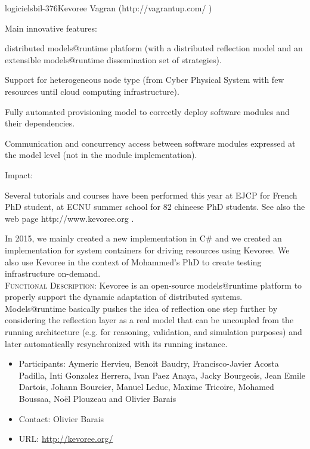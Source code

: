 \documentclass{ra2018}
\begin{document}
\begin{module}{logiciels}{bil-376}{Kevoree}
    Vagran (http://vagrantup.com/ )

Main innovative features:

    distributed models@runtime platform (with a distributed reflection model and an extensible models@runtime dissemination set of strategies).

    Support for heterogeneous node type (from Cyber Physical System with few resources until cloud computing infrastructure).

    Fully automated provisioning model to correctly deploy software modules and their dependencies.

    Communication and concurrency access between software modules expressed at the model level (not in the module implementation).

Impact:

Several tutorials and courses have been performed this year at EJCP for French PhD student, at ECNU summer school for 82 chineese PhD students. See also the web page http://www.kevoree.org .

In 2015, we mainly created a new implementation in C\# and we created an implementation for system containers for driving resources using Kevoree. We also use Kevoree in the context of Mohammed's PhD to create testing infrastructure on-demand.\\

 \textsc{Functional Description:}  Kevoree is an open-source models@runtime platform to properly support the dynamic adaptation of distributed systems. Models@runtime basically pushes the idea of reflection one step further by considering the reflection layer as a real model that can be uncoupled from the running architecture (e.g. for reasoning, validation, and simulation purposes) and later automatically resynchronized with its running instance.\\

   \begin{itemize}
      \item Participants: Aymeric Hervieu, Benoit Baudry, Francisco-Javier Acosta Padilla, Inti Gonzalez Herrera, Ivan Paez Anaya, Jacky Bourgeois, Jean Emile Dartois, Johann Bourcier, Manuel Leduc, Maxime Tricoire, Mohamed Boussaa, Noël Plouzeau and Olivier Barais
      \item Contact: Olivier Barais
      \item URL: \url{http://kevoree.org/}
   \end{itemize}

 \end{module}
\end{document}
